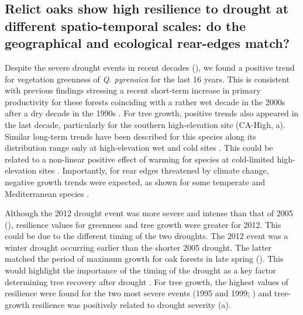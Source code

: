 \subsection{Relict oaks show high resilience to drought at different spatio-temporal scales: do the geographical and ecological rear-edges match?}\label{sec:dendro:Relict}
Despite the severe drought events in recent decades (), we found a positive trend for vegetation greenness of \emph{Q. pyrenaica} for the last 16 years. This is consistent with previous findings stressing a recent short-term increase in primary productivity for these forests coinciding with a rather wet decade in the 2000s after a dry decade in the 1990s \autocite{PerezLuqueetal2015OntologicalSystem}. For tree growth, positive trends also appeared in the last decade, particularly for the southern high-elevation site (CA-High, a). Similar long-term trends have been described for this species along its distribution range only at high-elevation wet and cold sites \autocite{GeaIzquierdoCanellas2014LocalClimate}. This could be related to a non-linear positive effect of warming for species at cold-limited high-elevation sites \autocite{Salzeretal2009RecentUnprecedented,GeaIzquierdoCanellas2014LocalClimate}. Importantly, for rear edges threatened by climate change, negative growth trends were expected, as shown for some temperate and Mediterranean species \autocite{SanchezSalgueroetal2012DroughtMain,Camareroetal2015NotEarly,DoradoLinanetal2017CoexistenceMediterraneanTemperate}.

Although the 2012 drought event was more severe and intense than that of 2005 (), resilience values for greenness and tree growth were greater for 2012. This could be due to the different timing of the two droughts. The 2012 event was a winter drought \autocite{Trigoetal2013RecordWinter} occurring earlier than the shorter 2005 drought. The latter matched the period of maximum growth for oak forests in late spring (). This would highlight the importance of the timing of the drought as a key factor determining tree recovery after drought \autocite{Camareroetal2015TimingDrought,Huangetal2018DroughtTiming}. For tree growth, the highest values of resilience were found for the two most severe events (1995 and 1999; ) and tree-growth resilience was positively related to drought severity (a).

